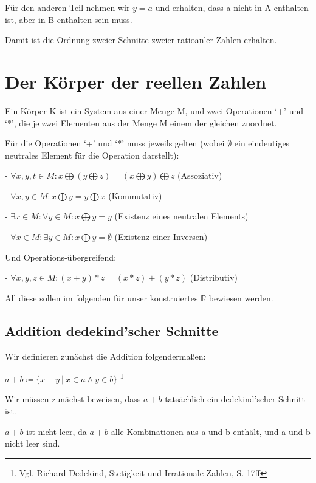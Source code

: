 \documentclass[12pt]{article}
\begin{document}
    Für den anderen Teil nehmen wir $y = a$ und erhalten, dass a nicht in A enthalten ist, aber in B enthalten sein
    muss.

    Damit ist die Ordnung zweier Schnitte zweier ratioanler Zahlen erhalten.

    \newpage

    \section{Der Körper der reellen Zahlen}

    Ein Körper K ist ein System aus einer Menge M, und zwei Operationen `+' und `*', die je zwei Elementen aus der Menge
    M einem der gleichen zuordnet.

    Für die Operationen `+' und `*' muss jeweils gelten (wobei $\emptyset$ ein eindeutiges neutrales Element für
    die Operation darstellt):

    - $\forall x, y, t \in M: x \bigoplus (y \bigoplus z) = (x \bigoplus y) \bigoplus z$  (Assoziativ)

    - $\forall x, y \in M: x \bigoplus y = y \bigoplus x$  (Kommutativ)

    - $\exists x \in M: \forall y \in M: x \bigoplus y = y$  (Existenz eines neutralen Elements)

    - $\forall x \in M: \exists y \in M: x \bigoplus y = \emptyset$  (Existenz einer Inversen)

    Und Operations-übergreifend:

    - $\forall x, y, z \in M: (x + y) * z = (x * z) + (y * z)$ (Distributiv)


    All diese sollen im folgenden für unser konstruiertes $\mathbb{R}$ bewiesen werden.

    \subsection{Addition dedekind'scher Schnitte}

    Wir definieren zunächst die Addition folgendermaßen:

    $a + b \coloneqq \{x + y \mspace{4mu} | \mspace{4mu} x \in a \land y \in b\}$
    \footnote{
        Vgl. Richard Dedekind, Stetigkeit und Irrationale Zahlen, S. 17ff
    }

    Wir müssen zunächst beweisen, dass $a + b$ tatsächlich ein dedekind'scher Schnitt ist.

    $a + b$ ist nicht leer, da $a + b$ alle Kombinationen aus a und b enthält, und a und b nicht leer sind.
\end{document}

